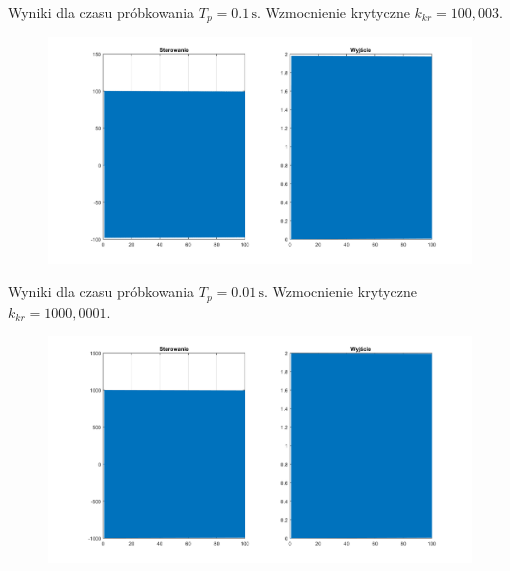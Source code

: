 \documentclass[a4paper, 12pt]{article}
\begin{document}
			\noindent Wyniki dla czasu próbkowania $T_p = 0.1 \, \mathrm{s}$. Wzmocnienie krytyczne $k_{kr} = 100,003$.
			\begin{figure}[H]
				\centering
				\includegraphics[width = \textwidth]{./img/jedno_k_100_003.png}
			\end{figure}
			\newpage \noindent
			Wyniki dla czasu próbkowania $T_p = 0.01 \, \mathrm{s}$. Wzmocnienie krytyczne $k_{kr} = 1000,0001$.
			\begin{figure}[H]
				\centering
				\includegraphics[width = \textwidth]{./img/jedno_k_1000_0001.png}
			\end{figure}
\end{document}
